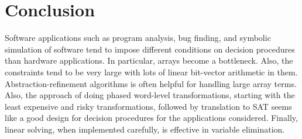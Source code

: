 \section{Conclusion}
Software applications such as program analysis, bug finding, and
symbolic simulation of software tend to impose different conditions on
decision procedures than hardware applications. In particular, arrays
become a bottleneck. Also, the constraints tend to be very large with
lots of linear bit-vector arithmetic in them. 
Abstraction-refinement algorithms 
is often helpful for handling large array terms.
Also, the approach of doing phased word-level
transformations, starting with the least expensive and risky 
transformations, followed by translation
to SAT seems like a good design for decision procedures for the
applications considered. Finally, linear solving, when implemented
carefully, is effective in variable elimination.

